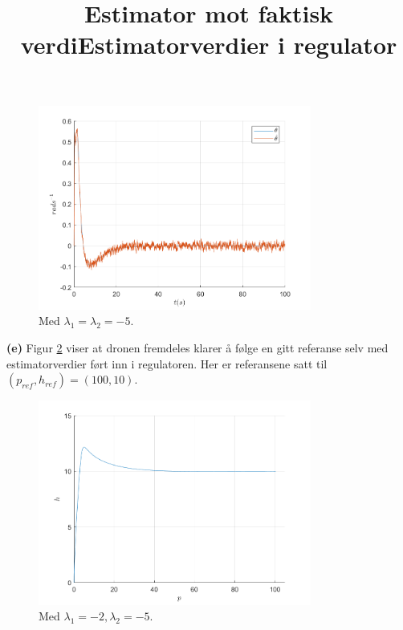 \documentclass[11pt, a4paper, norsk]{rapport1} %
\begin{document}
\begin{figure}
    \centering
    \title{\textbf{Estimator mot faktisk verdi}}
    \includegraphics[width=0.8\textwidth]{figures/oppg4_estimator2.png}
    \caption{Med $\lambda_1 = \lambda_2 = -5$.}
    \label{fig:8}
\end{figure}
\newline
\textbf{(e)} Figur \ref{fig:9} viser at dronen fremdeles klarer å følge en gitt referanse selv med estimatorverdier ført inn i regulatoren.
Her er referansene satt til $(p_{ref}, h_{ref}) = (100, 10)$.
\begin{figure}
    \centering
    \title{\textbf{Estimatorverdier i regulator}}
    \includegraphics[width=0.8\textwidth]{figures/oppg4_estimator_reg.png}
    \caption{Med $\lambda_1 = -2, \lambda_2 = -5$.}
    \label{fig:9}
\end{figure}
\end{document}
